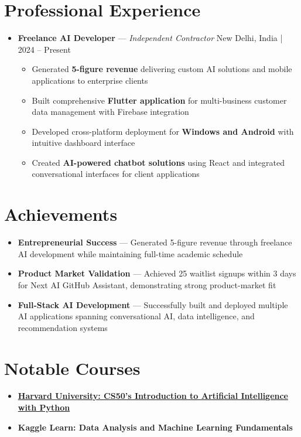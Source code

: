 \documentclass[letterpaper,10pt]{article}
\newcommand{\resumeSubHeadingListStart}{\begin{itemize}[leftmargin=*]}
\newcommand{\resumeSubHeadingListEnd}{\end{itemize}}
\begin{document}
\section*{Professional Experience}
\resumeSubHeadingListStart
  \item
    \textbf{Freelance AI Developer} — \textit{Independent Contractor} \hfill \textnormal{New Delhi, India | 2024 -- Present}
    \vspace{-2pt}
    \begin{itemize}[leftmargin=*, itemsep=1pt]
      \item Generated \textbf{5-figure revenue} delivering custom AI solutions and mobile applications to enterprise clients
      \item Built comprehensive \textbf{Flutter application} for multi-business customer data management with Firebase integration
      \item Developed cross-platform deployment for \textbf{Windows and Android} with intuitive dashboard interface
      \item Created \textbf{AI-powered chatbot solutions} using React and integrated conversational interfaces for client applications
    \end{itemize}
\resumeSubHeadingListEnd

\section*{Achievements}
\resumeSubHeadingListStart
  \item \textbf{Entrepreneurial Success} — Generated 5-figure revenue through freelance AI development while maintaining full-time academic schedule
  \item \textbf{Product Market Validation} — Achieved 25 waitlist signups within 3 days for Next AI GitHub Assistant, demonstrating strong product-market fit
  \item \textbf{Full-Stack AI Development} — Successfully built and deployed multiple AI applications spanning conversational AI, data intelligence, and recommendation systems
\resumeSubHeadingListEnd

\section*{Notable Courses}
\resumeSubHeadingListStart
  \item \textbf{\href{https://certificates.cs50.io/}{Harvard University: CS50's Introduction to Artificial Intelligence with Python}}
  \item \textbf{Kaggle Learn: Data Analysis and Machine Learning Fundamentals}
\resumeSubHeadingListEnd
\end{document}
